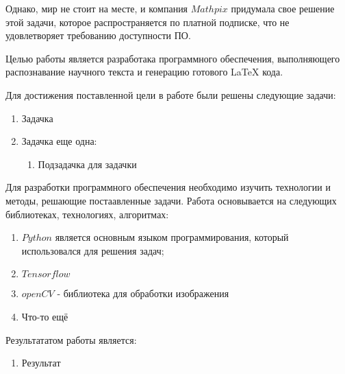 Однако, мир не стоит на месте, и компания $Mathpix$ придумала свое решение \cite{mathpix} этой задачи, которое распространяется по платной подписке, что не удовлетворяет требованию доступности ПО.

Целью работы является разработака программного обеспечения, выполняющего распознавание научного текста и  генерацию готового LaTeX кода.

Для достижения поставленной цели в работе были решены следующие задачи:
\begin{enumerate}
    \item Задачка
    \item Задачка еще одна:
        \begin{enumerate}
            \item Подзадачка для задачки
        \end{enumerate}
\end{enumerate}

Для разработки программного обеспечения необходимо изучить технологии и методы, решающие постаавленные задачи. Работа основывается на следующих библиотеках, технологиях, алгоритмах:
\begin{enumerate}
    \item $Python$ является основным языком программирования, который использовался для решения задач;
    \item $Tensorflow$
    \item $openCV$ - библиотека для обработки изображения
    \item Что-то ещё
\end{enumerate}

Результататом работы является:
\begin{enumerate}
    \item Результат
\end{enumerate}